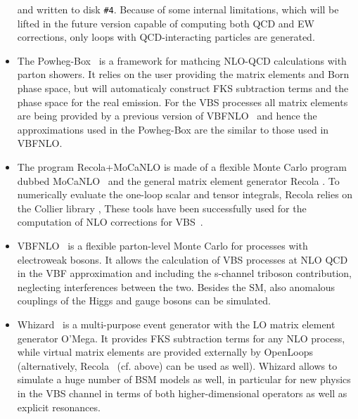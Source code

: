 \begin{itemize}
        and written to disk {\tt \#4}. Because of some internal limitations, which will be lifted in the future version capable of computing both QCD and EW corrections, 
        only loops with QCD-interacting particles are generated.
  \item The {\sc Powheg-Box}~\cite{Alioli:2010xd,Frixione:2007vw} is a framework for mathcing NLO-QCD calculations with parton showers.
It relies on the user providing the matrix elements and Born phase space, but will automaticaly construct FKS \cite{Frixione:1995ms} subtraction terms and the phase space for the real emission.
For the VBS processes all matrix elements are being provided by a previous version of {\sc VBFNLO}~\cite{Arnold:2008rz, Arnold:2011wj, Baglio:2014uba} and hence the approximations used in the {\sc Powheg-Box} are the similar to those used in {\sc VBFNLO}.

  \item The program {\sc Recola+MoCaNLO} is made of a flexible Monte Carlo program dubbed {\sc MoCaNLO}~\cite{MoCaNLO} and the general matrix element generator {\sc Recola} \cite{Actis:2012qn,Actis:2016mpe}.
To numerically evaluate the one-loop scalar and tensor integrals, {\sc Recola} relies on the {\sc Collier} library \cite{Denner:2014gla,Denner:2016kdg},
These tools have been successfully used for the computation of NLO corrections for VBS~\cite{Biedermann:2016yds,Biedermann:2017bss}.

  \item {\sc VBFNLO}~\cite{Arnold:2008rz, Arnold:2011wj, Baglio:2014uba} is a flexible
parton-level Monte Carlo for processes with electroweak bosons. It
allows the calculation of VBS processes at NLO QCD in the VBF
approximation and including the s-channel triboson contribution,
neglecting interferences between the two. Besides the SM, also anomalous
couplings of the Higgs and gauge bosons can be simulated.

  \item {\sc Whizard}~\cite{Moretti:2001zz,Kilian:2007gr} is a multi-purpose
event generator with the LO matrix element generator {\sc O'Mega}. It
provides FKS subtraction terms for any NLO process, while virtual matrix
elements are provided externally by {\sc
OpenLoops}~\cite{Cascioli:2011va} (alternatively, {\sc Recola}~\cite{Actis:2012qn,Actis:2016mpe}
(cf. above) can be used as well). {\sc Whizard} allows to simulate a
huge number of BSM models as well, in particular for new physics in
the VBS channel in terms of both higher-dimensional operators as well as explicit
resonances.

\end{itemize}

